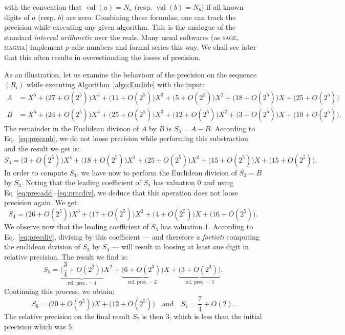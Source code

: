 \documentclass{article}
\DeclareMathOperator{\val}{val}
\begin{document}

\noindent
with the convention that $\val(a) = N_a$ (resp. $\val(b) = N_b$) if all
known digits of $a$ (resp. $b$) are zero.
Combining these formulas, one can track the precision while executing 
any given algorithm. This is the analogue of the standard \emph{interval 
arithmetic} over the reals. Many usual softwares (as \textsc{sage}, 
\textsc{magma}) implement $p$-adic numbers and formal series this way. 
We shall see later that this often results in overestimating the losses 
of precision.

\begin{ex}
\label{ex:Euclide}
As an illustration, let us examine the behaviour of the precision
on the sequence $(R_i)$ while executing Algorithm~\ref{algo:Euclide} 
with the input:
\begin{align*}
A & = X^5 + 
      \big(27 + O(2^5)\big) X^4 +
      \big(11 + O(2^5)\big) X^3 +
      \big(5 + O(2^5)\big) X^2 +
      \big(18 + O(2^5)\big) X +
      \big(25 + O(2^5)\big) \\
B & = X^5 + 
      \big(24 + O(2^5)\big) X^4 +
      \big(25 + O(2^5)\big) X^3 +
      \big(12 + O(2^5)\big) X^2 +
      \big(3 + O(2^5)\big) X +
      \big(10 + O(2^5)\big).
\end{align*}
The remainder in the Euclidean division of $A$ by $B$ is $S_3 = A-B$.
According to Eq.~\eqref{eq:precsub},
we do not loose precision while performing this substraction and the
result we get is:
$$S_3 = 
      \big(3 + O(2^5)\big) X^4 +
      \big(18 + O(2^5)\big) X^3 +
      \big(25 + O(2^5)\big) X^2 +
      \big(15 + O(2^5)\big) X +
      \big(15 + O(2^5)\big).$$ 
In order to compute $S_4$, we have now to perform the Euclidean division 
of $S_2 = B$ by $S_3$. Noting that the leading coefficient of $S_2$ has 
valuation $0$ and using Eq~\eqref{eq:precadd}--\eqref{eq:precdiv}, we 
deduce that this operation does not loose precision again. We get:
$$S_4 = 
      \big(26 + O(2^5)\big) X^3 +
      \big(17 + O(2^5)\big) X^2 +
      \big(4 + O(2^5)\big) X +
      \big(16 + O(2^5)\big).$$
We observe now that the leading coefficient of $S_4$ has valuation $1$. 
According to Eq.~\eqref{eq:precdiv}, divising by this coefficient ---
and therefore \emph{a fortioti} computing the euclidean division of 
$S_3$ by $S_4$ --- will result in loosing at least one digit in
relative precision. The result we find is:
$$S_5 = 
      \underbrace{\big(\textstyle \frac 3 4 + O(2^2)\big)}_{\text{rel. prec.} = 4} X^2 +
      \underbrace{\big(6 + O(2^3)\big)}_{\text{rel. prec.} = 2} X +
      \underbrace{\big(3 + O(2^3)\big)}_{\text{rel. prec.} = 3}.$$
Continuing this process, we obtain:
$$S_6 = 
      \big(20 + O(2^5)\big) X +
      \big(12 + O(2^5)\big) 
\quad \text{and} \quad
S_7 =
      \textstyle \frac 7 4 + O(2).$$
The relative precision on the final result $S_7$ is then $3$, which is
less than the initial precision which was $5$.
\end{ex}
\end{document}
